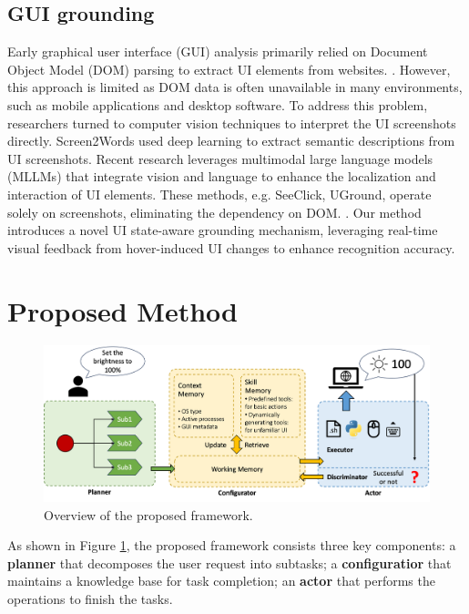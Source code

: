 \documentclass[11pt,letterpaper]{article}
\begin{document}
\subsection{GUI grounding}
Early graphical user interface (GUI) analysis primarily relied on Document Object Model (DOM) parsing to extract UI elements from websites. \cite{shi2017world}. 
However, this approach is limited as DOM data is often unavailable in many environments, such as mobile applications and desktop software. To address this problem, researchers turned to computer vision techniques to interpret the UI screenshots directly. Screen2Words used deep learning to extract semantic descriptions from UI screenshots. \cite{wang2021screen2words}
Recent research leverages multimodal large language models (MLLMs) that integrate vision and language to enhance the localization and interaction of UI elements. These methods, e.g. SeeClick, UGround, operate solely on screenshots, eliminating the dependency on DOM. \cite{cheng2024seeclick}\cite{gou2024navigating}.
Our method introduces a novel UI state-aware grounding mechanism, leveraging real-time visual feedback from hover-induced UI changes to enhance recognition accuracy. %

\section{Proposed Method}
%
\begin{figure}
    \centering
    \includegraphics[width=0.8\linewidth]{framework.png}
    \vspace{-0.50cm}
    \caption{Overview of the proposed framework. }
    \vspace{-0.50cm}
    \label{fig:framework}
\end{figure}
%
As shown in Figure \ref{fig:framework}, the proposed framework consists three key components: 
%
a \textbf{planner} that decomposes the user request into subtasks; 
%
a \textbf{configuratior} that maintains a knowledge base for task completion; 
%
an \textbf{actor} that performs the operations to finish the tasks.
%
\end{document}
